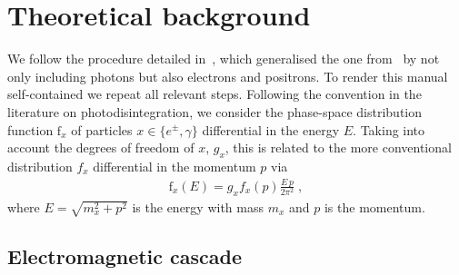 \documentclass[11pt,a4paper]{article}
\newcommand{\fpdi}{\mathrm{f}}
\newcommand{\eqsp}{\;}
\begin{document}
\section{Theoretical background}
We follow the procedure detailed in~\cite{Hufnagel:2018bjp}, which generalised the one from~\cite{Poulin:2015opa} by not only including photons but also electrons and positrons. To render this manual self-contained we repeat all relevant steps. Following the convention in the literature on photodisintegration, we consider the phase-space distribution function $\fpdi_x$ of particles $x \in \{e^\pm, \gamma \}$ differential in the energy $E$. Taking into account the degrees of freedom of $x$, $g_x$, this is related to the more conventional distribution $f_x$ differential in the momentum $p$ via
\begin{align}
\fpdi_x(E) = g_x f_x(p) \frac{E \, p}{2 \pi^2}\eqsp,
\end{align}
where $E = \sqrt{m_x^2 + p^2}$ is the energy with mass $m_x$ and $p$ is the momentum.

\subsection{Electromagnetic cascade}
\end{document}
